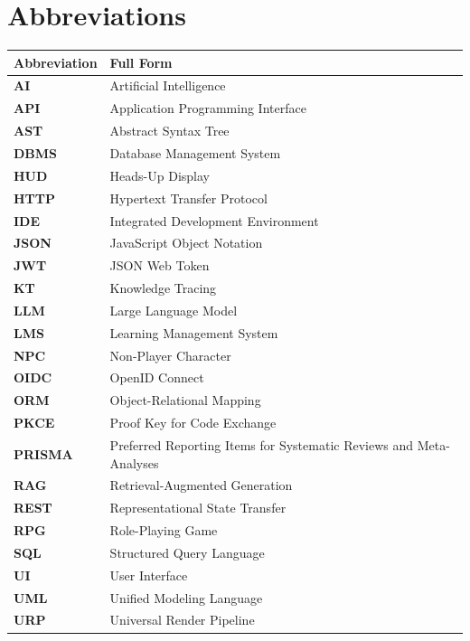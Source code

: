 \clearpage{}
{}
\chapter*{Abbreviations}

\noindent
\begin{tabularx}{\textwidth}{p{}X}
  \toprule
  \textbf{Abbreviation} & \textbf{Full Form} \\
  \midrule
  \textbf{AI}    & Artificial Intelligence \\
  \textbf{API}   & Application Programming Interface \\
  \textbf{AST}   & Abstract Syntax Tree \\
  \textbf{DBMS}  & Database Management System \\
  \textbf{HUD}   & Heads-Up Display \\
  \textbf{HTTP}  & Hypertext Transfer Protocol \\
  \textbf{IDE}   & Integrated Development Environment \\
  \textbf{JSON}  & JavaScript Object Notation \\
  \textbf{JWT}   & JSON Web Token \\
  \textbf{KT}    & Knowledge Tracing \\
  \textbf{LLM}   & Large Language Model \\
  \textbf{LMS}   & Learning Management System \\
  \textbf{NPC}   & Non-Player Character \\
  \textbf{OIDC}  & OpenID Connect \\
  \textbf{ORM}   & Object-Relational Mapping \\
  \textbf{PKCE}  & Proof Key for Code Exchange \\
  \textbf{PRISMA}& Preferred Reporting Items for Systematic Reviews and Meta-Analyses \\
  \textbf{RAG}   & Retrieval-Augmented Generation \\
  \textbf{REST}  & Representational State Transfer \\
  \textbf{RPG}   & Role-Playing Game \\
  \textbf{SQL}   & Structured Query Language \\
  \textbf{UI}    & User Interface \\
  \textbf{UML}   & Unified Modeling Language \\
  \textbf{URP}   & Universal Render Pipeline \\
  \bottomrule
\end{tabularx}
